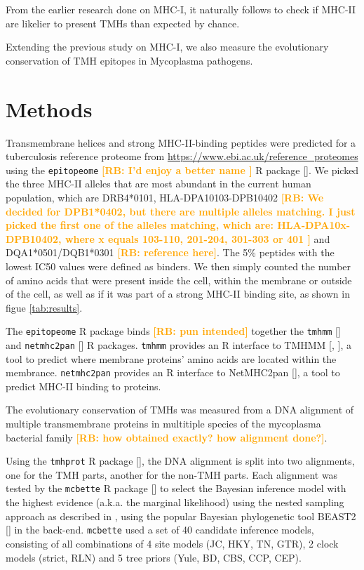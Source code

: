 \documentclass{article}
\newcommand{\richel}[1]{\textcolor{orange}{\textbf{[RB: #1]}}}
\begin{document}
From the earlier research done on MHC-I, it naturally follows to check
if MHC-II are likelier to present TMHs than expected by chance.

Extending the previous study on MHC-I, we also measure the evolutionary
conservation of TMH epitopes in Mycoplasma pathogens.

\section{Methods}

Transmembrane helices and strong MHC-II-binding peptides
were predicted for a tuberculosis reference proteome 
from \url{https://www.ebi.ac.uk/reference_proteomes}
using the \verb;epitopeome; 
\richel{
  I'd enjoy a better name
}
R package [\cite{epitopeome}].
We picked the three MHC-II alleles that are most abundant 
in the current human population, 
which are DRB4*0101, HLA-DPA10103-DPB10402 
\richel{
  We decided for DPB1*0402, but there are multiple alleles matching.
  I just picked the first one of the alleles matching, which are:
  HLA-DPA10x-DPB10402, where x equals 103-110, 201-204, 301-303 or 401
}
and DQA1*0501/DQB1*0301 \richel{reference here}.
The 5\% peptides with the lowest IC50 values were defined as binders.
We then simply counted the number of amino acids that were present inside the
cell, within the membrane or outside of the cell, as well as if it was part 
of a strong MHC-II binding site, as shown in figue \ref{tab:results}.


The \verb;epitopeome; R package \cite{epitopeome} binds \richel{pun intended} 
together the \verb;tmhmm; [\cite{tmhmm}] and \verb;netmhc2pan; [\cite{netmhc2pan}] 
R packages. \verb;tmhmm; provides an R interface to
TMHMM [\cite{krogh2001predicting}, \cite{sonnhammer1998hidden}], a tool
to predict where membrane proteins' amino acids are located within the
membrance.   
\verb;netmhc2pan; provides an R interface to
NetMHC2pan [\cite{jensen2018improved}], a tool
to predict MHC-II binding to proteins.

The evolutionary conservation of TMHs was measured from a
DNA alignment of multiple transmembrane proteins in multitiple
species of the mycoplasma bacterial family
\richel{how obtained exactly? how alignment done?}.

Using the \verb;tmhprot; R package [\cite{tmhprot}], the DNA alignment is split
into two alignments, one for the TMH parts, another for the non-TMH
parts. Each alignment was tested by the \verb;mcbette; 
R package [\cite{mcbette}] to select the Bayesian inference model with
the highest evidence (a.k.a. the marginal likelihood) using the nested
sampling approach as described in \cite{maturana2018model},
using the popular Bayesian phylogenetic tool 
BEAST2 [\cite{bouckaert2014beast}] in the back-end.
\verb;mcbette; used a set of 40 candidate inference models, 
consisting of all combinations of 
4 site models (JC, HKY, TN, GTR), 
2 clock models (strict, RLN) and 
5 tree priors (Yule, BD, CBS, CCP, CEP).
\end{document}
